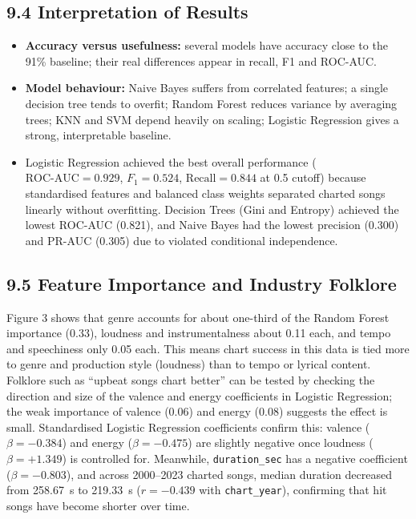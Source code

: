 \documentclass[11pt,a4paper]{article}
\begin{document}
\subsection*{9.4 Interpretation of Results}
\begin{itemize}
  \item \textbf{Accuracy versus usefulness:} several models have accuracy close to the 91\% baseline; their real differences appear in recall, F1 and ROC-AUC.
  \item \textbf{Model behaviour:} Naive Bayes suffers from correlated features; a single decision tree tends to overfit; Random Forest reduces variance by averaging trees; KNN and SVM depend heavily on scaling; Logistic Regression gives a strong, interpretable baseline.
  \item Logistic Regression achieved the best overall performance ($\text{ROC-AUC} = 0.929$, $F_1 = 0.524$, $\text{Recall} = 0.844$ at 0.5 cutoff) because standardised features and balanced class weights separated charted songs linearly without overfitting. Decision Trees (Gini and Entropy) achieved the lowest ROC-AUC (0.821), and Naive Bayes had the lowest precision (0.300) and PR-AUC (0.305) due to violated conditional independence.
\end{itemize}

\subsection*{9.5 Feature Importance and Industry Folklore}
Figure 3 shows that genre accounts for about one-third of the Random Forest importance (0.33), loudness and instrumentalness about 0.11 each, and tempo and speechiness only 0.05 each. This means chart success in this data is tied more to genre and production style (loudness) than to tempo or lyrical content. Folklore such as ``upbeat songs chart better'' can be tested by checking the direction and size of the valence and energy coefficients in Logistic Regression; the weak importance of valence (0.06) and energy (0.08) suggests the effect is small. Standardised Logistic Regression coefficients confirm this: valence ($\beta = -0.384$) and energy ($\beta = -0.475$) are slightly negative once loudness ($\beta = +1.349$) is controlled for. Meanwhile, \texttt{duration\_sec} has a negative coefficient ($\beta = -0.803$), and across 2000--2023 charted songs, median duration decreased from 258.67~s to 219.33~s ($r = -0.439$ with \texttt{chart\_year}), confirming that hit songs have become shorter over time.
\end{document}
